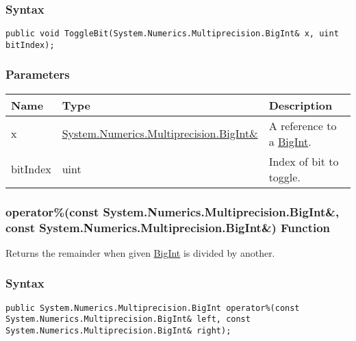 \documentclass[a4paper,oneside,11.000000pt]{book}
\begin{document}
\subsubsection*{Syntax}
\texttt{public void ToggleBit(System.Numerics.Multiprecision.BigInt\& x, uint bitIndex);}
\subsubsection*{Parameters}
\begin{flushleft}
\begin{supertabular}[l]{!{\raggedright}p{1.94573cm}!{\raggedright}p{7.92093cm}!{\raggedright}p{4.93333cm}}
\textbf{Name}
& \textbf{Type}
& \textbf{Description}
\\
\hline
x
& \hyperlink{System.Numerics.Multiprecision.BigInt}{System.\-Numerics.\-Multiprecision.\-BigInt\&\-}
& A reference to a \hyperlink{System.Numerics.Multiprecision.BigInt}{BigInt}.

\\
bitIndex
& uint
& Index of bit to toggle.

\\
\end{supertabular}

\end{flushleft}
\clearpage

\hypertarget{System.Numerics.Multiprecision.operator.remainder.C.R.System.Numerics.Multiprecision.BigInt.C.R.System.Numerics.Multiprecision.BigInt}{\subsubsection*{operator\%(const System.Numerics.Multiprecision.BigInt\&, const System.Numerics.Multiprecision.BigInt\&) Function}}
\begin{flushleft}
Returns the remainder when given \hyperlink{System.Numerics.Multiprecision.BigInt}{BigInt} is divided by another.

\end{flushleft}
\subsubsection*{Syntax}
\texttt{public System.Numerics.Multiprecision.BigInt operator\%(const System.Numerics.Multiprecision.BigInt\& left, const System.Numerics.Multiprecision.BigInt\& right);}
\end{document}
